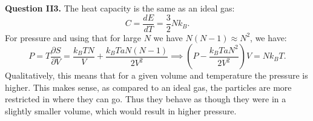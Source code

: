 \documentclass[letterpaper, reqno,11pt]{article}
\begin{document}
{\medskip\noindent\bf Question II3.} The heat capacity is the same as an ideal gas:
\[
C=\frac{dE}{dT}=\frac{3}{2}Nk_B
.\]
For pressure and using that for large $N$ we have $N(N-1)\approx N^2$, we have:
\[
P=T\frac{\partial S}{\partial V}=\frac{k_BTN}{V}+ \frac{k_BTaN(N-1)}{2V^2}\implies (P- \frac{k_BTaN^2}{2V^2})V=Nk_BT
.\]
Qualitatively, this means that for a given volume and temperature the pressure is higher. This makes sense, as compared to an ideal gas, the particles are more restricted in where they can go. Thus they behave as though they were in a slightly smaller volume, which would result in higher pressure.
\end{document}
